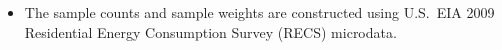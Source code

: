 \begin{itemize}
\item The sample counts and sample weights are constructed using U.S.~EIA 2009 Residential Energy Consumption Survey (RECS) microdata.
\end{itemize}
